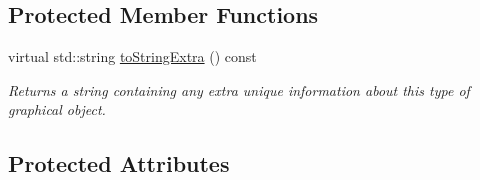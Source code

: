 \subsection*{Protected Member Functions}
\begin{DoxyCompactItemize}
\item 
virtual std\+::string \mbox{\hyperlink{classsgl_1_1GObject_a4fcdf8de5c6de92242a975d83d8f23ea}{to\+String\+Extra}} () const
\begin{DoxyCompactList}\small\item\em Returns a string containing any extra unique information about this type of graphical object. \end{DoxyCompactList}\end{DoxyCompactItemize}
\subsection*{Protected Attributes}
